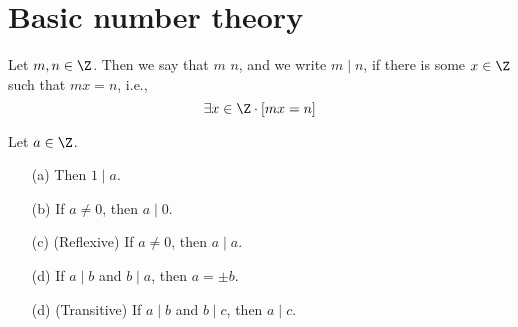 \chapter{Basic number theory}

\begin{defn}
  Let $m, n \in \Z$.
  Then we say that $m$  $n$, and we write $m \mid n$, if
  there is some $x \in \Z$ such that $mx = n$, i.e.,
  \[
    \exists x \in \Z \cdot [mx = n]
  \]
\end{defn}


\begin{prop}
  Let $a \in \Z$.
  \begin{itemize}
  \item[(a)] Then $1 \mid a$.
  \item[(b)] If $a \neq 0$, then $a \mid 0$.
  \item[(c)] (Reflexive) If $a \neq 0$, then $a \mid a$.
  \item[(d)] If $a \mid b$ and $b \mid a$, then $a = \pm b$.  
  \item[(d)] (Transitive) If $a \mid b$ and $b \mid c$, then $a \mid c$.
  \end{itemize}
\end{prop}
